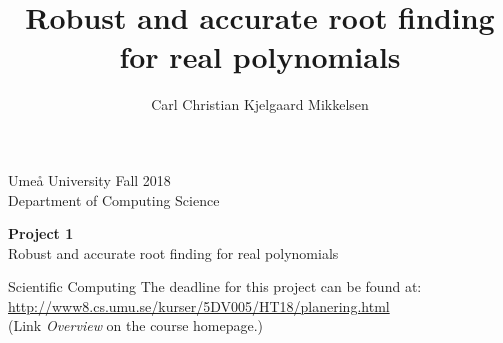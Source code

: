 \documentclass[a4paper,12pt]{article}
\title{Robust and accurate root finding for real polynomials}
\author{Carl Christian Kjelgaard Mikkelsen}
\begin{document}
 

\linenumbers
\thispagestyle{empty}

\noindent
Ume\aa{} University \hfill Fall 2018 \\
Department of Computing Science\\

\vskip 2.5cm

\begin{center} {\Huge {\bf Project 1}}\\{\Large Robust and accurate root finding for real polynomials}\end{center} \vskip 0.3cm
\begin{center}
  {\huge Scientific Computing}
  \vfill
  {\Large The deadline for this project can be found at: \href{http://www8.cs.umu.se/kurser/5DV005/HT18/planering.html}{http://www8.cs.umu.se/kurser/5DV005/HT18/planering.html}\\
  (Link \emph{Overview} on the course homepage.)}
\end{center}
  \vfill
\end{document}
